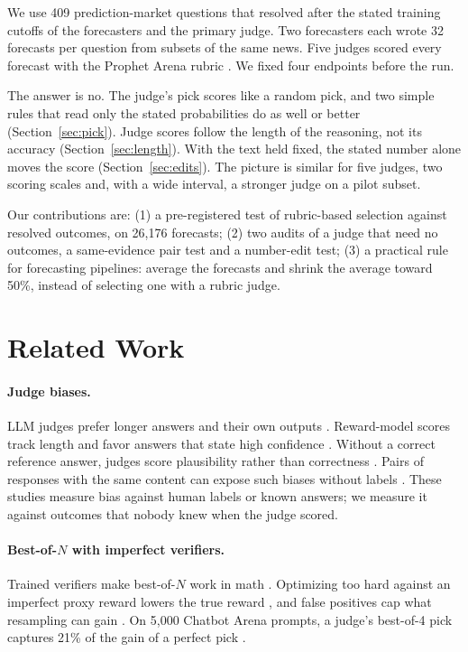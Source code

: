 \documentclass[letterpaper]{article} %
\begin{document}
We use 409 prediction-market questions that resolved after the stated training cutoffs of the forecasters and the primary judge. Two forecasters each wrote 32 forecasts per question from subsets of the same news. Five judges scored every forecast with the Prophet Arena rubric \citep{prophetarena2025}. We fixed four endpoints before the run.

The answer is no. The judge's pick scores like a random pick, and two simple rules that read only the stated probabilities do as well or better (Section~\ref{sec:pick}). Judge scores follow the length of the reasoning, not its accuracy (Section~\ref{sec:length}). With the text held fixed, the stated number alone moves the score (Section~\ref{sec:edits}). The picture is similar for five judges, two scoring scales and, with a wide interval, a stronger judge on a pilot subset.

Our contributions are: (1) a pre-registered test of rubric-based selection against resolved outcomes, on 26,176 forecasts; (2) two audits of a judge that need no outcomes, a same-evidence pair test and a number-edit test; (3) a practical rule for forecasting pipelines: average the forecasts and shrink the average toward 50\%, instead of selecting one with a rubric judge.

\section{Related Work}
\paragraph{Judge biases.} LLM judges prefer longer answers \citep{zheng2023judging,saito2023verbosity,dubois2024length} and their own outputs \citep{panickssery2024llm}. Reward-model scores track length \citep{singhal2023long} and favor answers that state high confidence \citep{leng2025taming}. Without a correct reference answer, judges score plausibility rather than correctness \citep{krumdick2025nofree,zhou2026more}. Pairs of responses with the same content can expose such biases without labels \citep{labelfree2026}. These studies measure bias against human labels or known answers; we measure it against outcomes that nobody knew when the judge scored.

\paragraph{Best-of-$N$ with imperfect verifiers.} Trained verifiers make best-of-$N$ work in math \citep{cobbe2021training,lightman2024lets}. Optimizing too hard against an imperfect proxy reward lowers the true reward \citep{gao2023scaling}, and false positives cap what resampling can gain \citep{stroebl2024inference}. On 5,000 Chatbot Arena prompts, a judge's best-of-4 pick captures 21\% of the gain of a perfect pick \citep{landesberg2026}.
\end{document}
